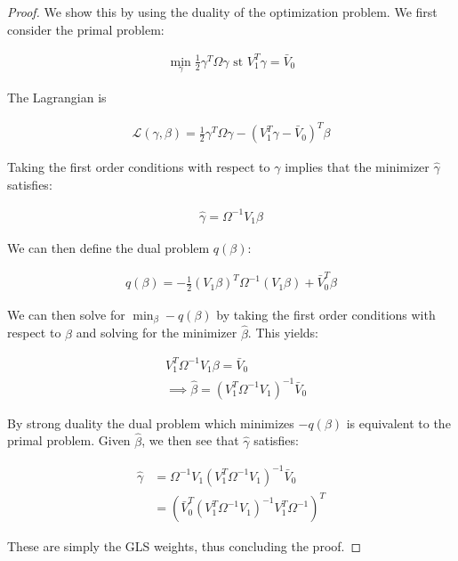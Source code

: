 \begin{proof}
    We show this by using the duality of the optimization problem. We first consider the primal problem:
    
    \begin{align*}
        \min_{\gamma} \frac{1}{2}\gamma^T\Omega\gamma \text{ st } V_1^T\gamma = \bar{V}_0
    \end{align*}
    
    The Lagrangian is
    
    \begin{align*}
        \mathcal{L}(\gamma, \beta) = \frac{1}{2}\gamma^T\Omega\gamma - (V_1^T\gamma - \bar{V}_0)^T\beta
    \end{align*}
    
    Taking the first order conditions with respect to $\gamma$ implies that the minimizer $\hat{\gamma}$ satisfies:
    
    \begin{align*}
        \hat{\gamma} = \Omega^{-1}V_1\beta
    \end{align*}

    We can then define the dual problem $q(\beta)$:
    
    \begin{align*}
        q(\beta) = -\frac{1}{2}(V_1\beta)^T\Omega^{-1}(V_1\beta) + \bar{V}_0^T\beta
    \end{align*}
    
    We can then solve for $\min_{\beta} -q(\beta)$ by taking the first order conditions with respect to $\beta$ and solving for the minimizer $\hat{\beta}$. This yields:
    
    \begin{align*}
        & V_1^T\Omega^{-1}V_1\beta = \bar{V}_0 \\
        &\implies \hat{\beta} = (V_1^T\Omega^{-1}V_1)^{-1}\bar{V}_0
    \end{align*}
    
    By strong duality the dual problem which minimizes $-q(\beta)$ is equivalent to the primal problem. Given $\hat{\beta}$, we then see that $\hat{\gamma}$ satisfies:
    
    \begin{align*}
        \hat{\gamma} &= \Omega^{-1}V_1(V_1^T\Omega^{-1}V_1)^{-1}\bar{V}_0 \\
        &= (\bar{V}_0^T(V_1^T\Omega^{-1}V_1)^{-1}V_1^T\Omega^{-1})^T
    \end{align*}
    
    These are simply the GLS weights, thus concluding the proof.
\end{proof}

